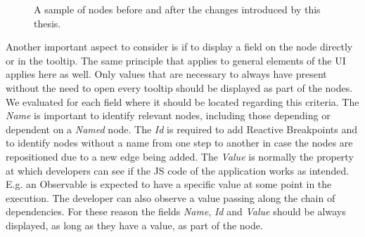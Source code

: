 \begin{figure}[!h]
	\centering
	\hfill
	\caption{A sample of nodes before and after the changes introduced by this thesis.}
	\label{fig:Nodes}
\end{figure}
Another important aspect to consider is if to display a field on the node directly or in the tooltip. The same principle that applies to general elements of the UI applies here as well. Only values that are necessary to always have present without the need to open every tooltip should be displayed as part of the nodes. We evaluated for each field where it should be located regarding this criteria. The \emph{Name} is important to identify relevant nodes, including those depending or dependent on a \emph{Named} node. The \emph{Id} is required to add Reactive Breakpoints and to identify nodes without a name from one step to another in case the nodes are repositioned due to a new edge being added. The \emph{Value} is normally the property at which developers can see if the JS code of the application works as intended. E.g. an Observable is expected to have a specific value at some point in the execution. The developer can also observe a value passing along the chain of dependencies. For these reason the fields \emph{Name}, \emph{Id} and \emph{Value} should be always displayed, as long as they have a value, as part of the node.
